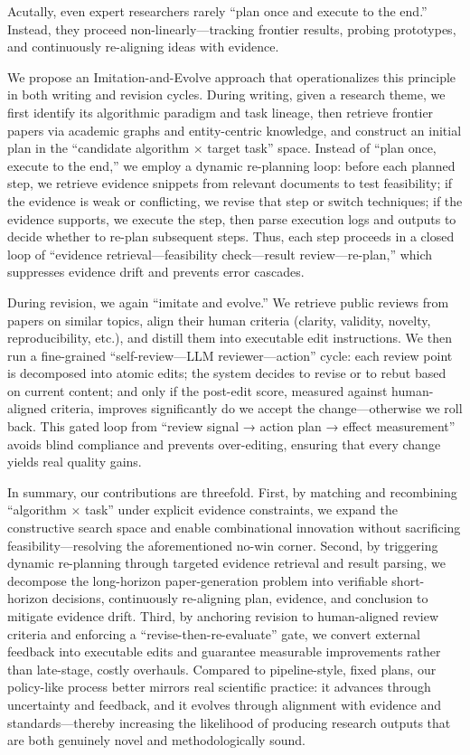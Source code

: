 \documentclass[manuscript,review,anonymous]{acmart}
\begin{document}
Acutally, even expert researchers rarely “plan once and execute to the end.” Instead, they proceed non-linearly—tracking frontier results, probing prototypes, and continuously re-aligning ideas with evidence. 

We propose an Imitation-and-Evolve approach that operationalizes this principle in both writing and revision cycles. During writing, given a research theme, we first identify its algorithmic paradigm and task lineage, then retrieve frontier papers via academic graphs and entity-centric knowledge, and construct an initial plan in the “candidate algorithm × target task” space. Instead of “plan once, execute to the end,” we employ a dynamic re-planning loop: before each planned step, we retrieve evidence snippets from relevant documents to test feasibility; if the evidence is weak or conflicting, we revise that step or switch techniques; if the evidence supports, we execute the step, then parse execution logs and outputs to decide whether to re-plan subsequent steps. Thus, each step proceeds in a closed loop of “evidence retrieval—feasibility check—result review—re-plan,” which suppresses evidence drift and prevents error cascades.

During revision, we again “imitate and evolve.” We retrieve public reviews from papers on similar topics, align their human criteria (clarity, validity, novelty, reproducibility, etc.), and distill them into executable edit instructions. We then run a fine-grained “self-review—LLM reviewer—action” cycle: each review point is decomposed into atomic edits; the system decides to revise or to rebut based on current content; and only if the post-edit score, measured against human-aligned criteria, improves significantly do we accept the change—otherwise we roll back. This gated loop from “review signal → action plan → effect measurement” avoids blind compliance and prevents over-editing, ensuring that every change yields real quality gains.

In summary, our contributions are threefold. First, by matching and recombining “algorithm × task” under explicit evidence constraints, we expand the constructive search space and enable combinational innovation without sacrificing feasibility—resolving the aforementioned no-win corner. Second, by triggering dynamic re-planning through targeted evidence retrieval and result parsing, we decompose the long-horizon paper-generation problem into verifiable short-horizon decisions, continuously re-aligning plan, evidence, and conclusion to mitigate evidence drift. Third, by anchoring revision to human-aligned review criteria and enforcing a “revise-then-re-evaluate” gate, we convert external feedback into executable edits and guarantee measurable improvements rather than late-stage, costly overhauls. Compared to pipeline-style, fixed plans, our policy-like process better mirrors real scientific practice: it advances through uncertainty and feedback, and it evolves through alignment with evidence and standards—thereby increasing the likelihood of producing research outputs that are both genuinely novel and methodologically sound.
\end{document}
